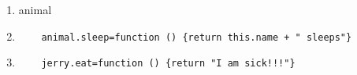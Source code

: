 \begin{enumerate}
\item animal
\item 
\begin{verbatim}
	animal.sleep=function () {return this.name + " sleeps"}
\end{verbatim}
\item 
\begin{verbatim}
	jerry.eat=function () {return "I am sick!!!"}
\end{verbatim}
\end{enumerate}